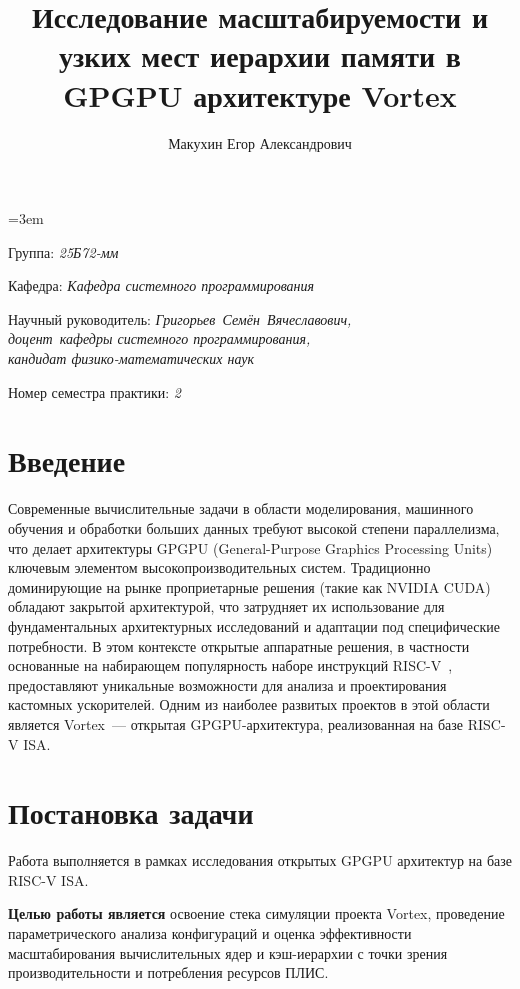 \documentclass[a4paper]{article}
\title{Исследование масштабируемости и узких мест иерархии памяти в GPGPU архитектуре Vortex}
\author{Макухин Егор Александрович}
\date{}
\begin{document}
\raggedbottom
\sloppy
\emergencystretch=3em

\maketitle

\begin{flushright}
    Группа: \emph{25Б72-мм}

    Кафедра: \emph{Кафедра системного программирования}

    Научный руководитель: \emph{Григорьев~Семён~Вячеславович,}\\
    \emph{доцент~кафедры системного программирования,}\\
    \emph{кандидат физико-математических наук}
    
    Номер семестра практики: \emph{2}
\end{flushright} 

\section{Введение}

Современные вычислительные задачи в области моделирования, машинного обучения и обработки больших данных требуют высокой степени параллелизма, что делает архитектуры GPGPU (General-Purpose Graphics Processing Units) ключевым элементом высокопроизводительных систем. Традиционно доминирующие на рынке проприетарные решения (такие как NVIDIA CUDA) обладают закрытой архитектурой, что затрудняет их использование для фундаментальных архитектурных исследований и адаптации под специфические потребности. В этом контексте открытые аппаратные решения, в частности основанные на набирающем популярность наборе инструкций RISC-V~\cite{riscv_isa}, предоставляют уникальные возможности для анализа и проектирования кастомных ускорителей. Одним из наиболее развитых проектов в этой области является Vortex~--- открытая GPGPU-архитектура, реализованная на базе RISC-V ISA.

\section{Постановка задачи}

Работа выполняется в рамках исследования открытых GPGPU архитектур на базе RISC-V ISA. 

\textbf{Целью работы является} освоение стека симуляции проекта Vortex, проведение параметрического анализа конфигураций и оценка эффективности масштабирования вычислительных ядер и кэш-иерархии с точки зрения производительности и потребления ресурсов ПЛИС.
\end{document}
